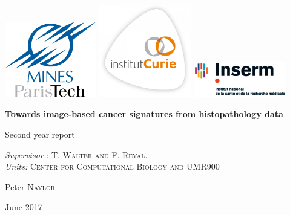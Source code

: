 \documentclass{article}
\begin{document}
\begin{titlepage}

\begin{center}
\includegraphics[width=0.3\textwidth]{Mines_ParisTech.png}
\includegraphics[width=0.3\textwidth]{CURIE.jpg}
\includegraphics[width=0.3\textwidth]{INSERM.jpg}
\end{center}


\noindent
\hrulefill
  \begin{center} \bfseries\Huge
Towards image-based cancer signatures from histopathology data
  \end{center}
  \begin{center} \huge
   Second year report
  \end{center}
\hrulefill

   \begin{center}  \large
\textit{Supervisor} : \textsc{T. Walter and F. Reyal}. \\
\textit{Units:} \textsc{Center for Computational Biology and UMR900}

   \end{center}

  \begin{center} \Large
  Peter \textsc{Naylor}
  \end{center}


  \begin{center}  \large
    June 2017
  \end{center}

\end{titlepage}
\end{document}
